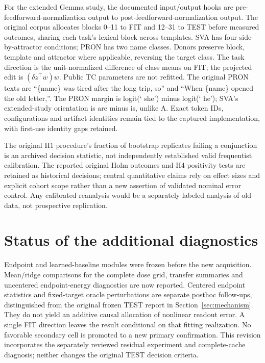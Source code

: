 For the extended Gemma study, the documented input/output hooks are pre-feedforward-normalization output to post-feedforward-normalization output. The original corpus allocates blocks 0--11 to FIT and 12--31 to TEST before measured outcomes, sharing each task's lexical block across templates. SVA has four side-by-attractor conditions; PRON has two name classes. Donors preserve block, template and attractor where applicable, reversing the target class. The task direction is the unit-normalized difference of class means on FIT; the projected edit is $(\delta z^\top w)w$. Public TC parameters are not refitted. The original PRON texts are ``\{name\} was tired after the long trip, so'' and ``When \{name\} opened the old letter,''. The PRON margin is logit(` she') minus logit(` he'); SVA's extended-study orientation is are minus is, unlike A. Exact token IDs, configurations and artifact identities remain tied to the captured implementation, with first-use identity gaps retained.

The original H1 procedure's fraction of bootstrap replicates failing a conjunction is an archived decision statistic, not independently established valid frequentist calibration. The reported original Holm outcomes and H4 positivity tests are retained as historical decisions; central quantitative claims rely on effect sizes and explicit cohort scope rather than a new assertion of validated nominal error control. Any calibrated reanalysis would be a separately labeled analysis of old data, not prospective replication.

\section{Status of the additional diagnostics}
Endpoint and learned-baseline modules were frozen before the new acquisition. Mean/ridge comparisons for the complete dose grid, transfer summaries and uncentered endpoint-energy diagnostics are now reported. Centered endpoint statistics and fixed-target oracle perturbations are separate posthoc follow-ups, distinguished from the original frozen TEST report in Section~\ref{sec:mechanism}. They do not yield an additive causal allocation of nonlinear readout error. A single FIT direction leaves the result conditional on that fitting realization. No favorable secondary cell is promoted to a new primary confirmation. This revision incorporates the separately reviewed residual experiment and complete-cache diagnosis; neither changes the original TEST decision criteria.


